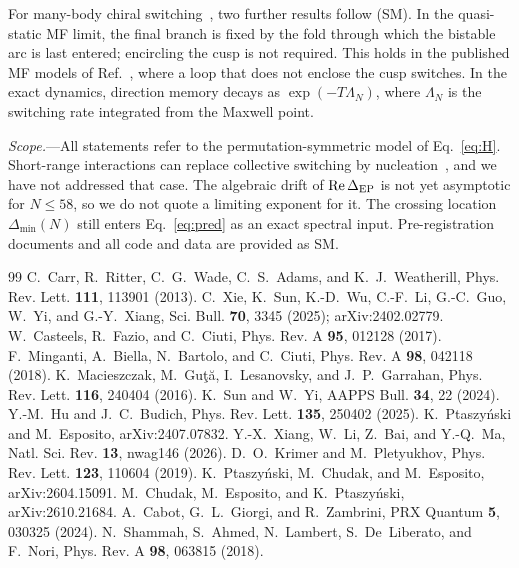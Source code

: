 \documentclass[aps,prl,twocolumn,superscriptaddress,amsmath,amssymb,reprint]{revtex4-2}
\begin{document}
For many-body chiral switching~\cite{Xie2025}, two further results follow (SM). In the quasi-static MF limit, the final branch is fixed by the fold through which the bistable arc is last entered; encircling the cusp is not required. This holds in the published MF models of Ref.~\cite{Xie2025}, where a loop that does not enclose the cusp switches. In the exact dynamics, direction memory decays as $\exp(-T\Lambda_N)$, where $\Lambda_N$ is the switching rate integrated from the Maxwell point.

\emph{Scope.}---All statements refer to the permutation-symmetric model of Eq.~\eqref{eq:H}. Short-range interactions can replace collective switching by nucleation~\cite{Xiang2026}, and we have not addressed that case. The algebraic drift of ${\rm Re}\,\Delta_{\rm EP}$ is not yet asymptotic for $N\le58$, so we do not quote a limiting exponent for it. The crossing location $\Delta_{\min}(N)$ still enters Eq.~\eqref{eq:pred} as an exact spectral input. Pre-registration documents and all code and data are provided as SM.

\begin{thebibliography}{99}
 C.~Carr, R.~Ritter, C.~G.~Wade, C.~S.~Adams, and K.~J.~Weatherill, Phys. Rev. Lett. \textbf{111}, 113901 (2013).
 C.~Xie, K.~Sun, K.-D.~Wu, C.-F.~Li, G.-C.~Guo, W.~Yi, and G.-Y.~Xiang, Sci. Bull. \textbf{70}, 3345 (2025); arXiv:2402.02779.
 W.~Casteels, R.~Fazio, and C.~Ciuti, Phys. Rev. A \textbf{95}, 012128 (2017).
 F.~Minganti, A.~Biella, N.~Bartolo, and C.~Ciuti, Phys. Rev. A \textbf{98}, 042118 (2018).
 K.~Macieszczak, M.~Gu\c{t}\u{a}, I.~Lesanovsky, and J.~P.~Garrahan, Phys. Rev. Lett. \textbf{116}, 240404 (2016).
 K.~Sun and W.~Yi, AAPPS Bull. \textbf{34}, 22 (2024).
 Y.-M.~Hu and J.~C.~Budich, Phys. Rev. Lett. \textbf{135}, 250402 (2025).
 K.~Ptaszy\'nski and M.~Esposito, arXiv:2407.07832.
 Y.-X.~Xiang, W.~Li, Z.~Bai, and Y.-Q.~Ma, Natl. Sci. Rev. \textbf{13}, nwag146 (2026).
 D.~O.~Krimer and M.~Pletyukhov, Phys. Rev. Lett. \textbf{123}, 110604 (2019).
 K.~Ptaszy\'nski, M.~Chudak, and M.~Esposito, arXiv:2604.15091.
 M.~Chudak, M.~Esposito, and K.~Ptaszy\'nski, arXiv:2610.21684.
 A.~Cabot, G.~L.~Giorgi, and R.~Zambrini, PRX Quantum \textbf{5}, 030325 (2024).
 N.~Shammah, S.~Ahmed, N.~Lambert, S.~De~Liberato, and F.~Nori, Phys. Rev. A \textbf{98}, 063815 (2018).
\end{thebibliography}
\end{document}
